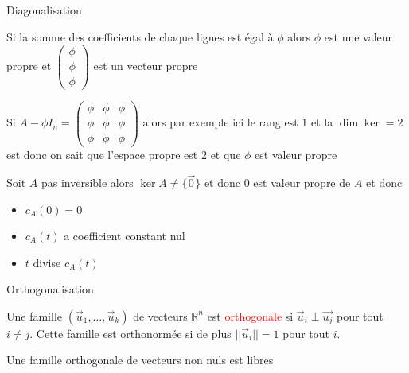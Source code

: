 \begin{parag}{Diagonalisation}
    \begin{truc}
        Si la somme des coefficients de chaque lignes est égal à $\phi$ alors $\phi$ est une valeur propre et $\begin{pmatrix}
            \phi \\ \phi \\ \phi
        \end{pmatrix}$ est un vecteur propre
    \end{truc}
    \begin{truc}
        Si $A - \phi I_n = \begin{pmatrix}
            \phi & \phi & \phi\\
            \phi & \phi & \phi\\
            \phi & \phi & \phi
        \end{pmatrix}$ alors par exemple ici le rang est $1$ et la $\dim \ker = 2$ est donc on sait que l'espace propre est $2$ et que $\phi$ est valeur propre
    \end{truc}
    \begin{truc}
        Soit $A$ pas inversible alors $\ker A \neq \{\vec{0}\}$ et donc $0$ est valeur propre de $A$ et donc \\
        \begin{itemize}
            \item $c_A(0) =0$\\
            \item $c_A(t)$ a coefficient constant nul
            \item $t$ divise $c_A(t)$
        \end{itemize}
    \end{truc}
\end{parag}

\begin{parag}{Orthogonalisation}
    \begin{definition}
     Une famille $(\vec{u}_1, \dots, \vec{u}_k)$ de vecteurs $\mathbb{R}^n$ est \textcolor{red}{orthogonale} si $\vec{u}_i \perp \vec{u_j}$ pour tout $i \neq j$. Cette famille est orthonormée si de plus $||\vec{u}_i|| = 1$ pour tout $i$.
    \end{definition}
    \begin{truc}
        Une famille orthogonale de vecteurs non nuls est libres
    \end{truc}
\end{parag}